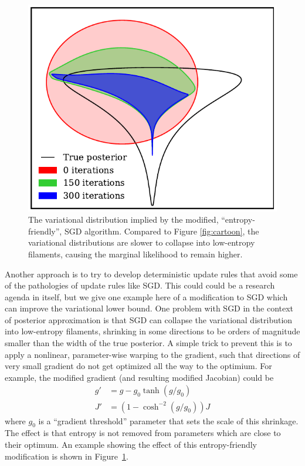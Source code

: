 \documentclass[]{article}
\begin{document}
\begin{figure}
\begin{center}
\includegraphics[width=0.9\columnwidth]{../experiments/2015_03_02_funnel/3_grad_threshold/dists.pdf}
\caption{The variational distribution implied by the modified, ``entropy-friendly'', SGD algorithm.
Compared to Figure \ref{fig:cartoon}, the variational distributions are slower to collapse into low-entropy filaments, causing the marginal likelihood to remain higher.}
\label{fig:cartoon-fatter}
\end{center}
\end{figure}

Another approach is to try to develop deterministic update rules
that avoid some of the pathologies of update rules like SGD.
This could could be a research agenda in itself, but we give one example here of a modification to
SGD which can improve the variational lower bound.
One problem with SGD in the context of posterior approximation is that
SGD can collapse the variational distribution into low-entropy filaments, shrinking in some directions to be orders of magnitude smaller than the width of the true posterior.
A simple trick to prevent this is to apply a nonlinear, parameter-wise warping
to the gradient, such that directions of very small gradient do not get optimized all the way
to the optimium.
For example, the modified gradient (and resulting modified Jacobian) could be
\begin{align}
g' & = g - g_0 \tanh \left(g / g_0 \right) \\
J' & = \left(1 - \cosh^{-2} (g / g_0) \right) J 
\end{align}
where $g_0$ is a ``gradient threshold'' parameter that sets the scale of this shrinkage.
The effect is that entropy is not removed from parameters which are close to their optimum.
An example showing the effect of this entropy-friendly modification is shown in Figure~\ref{fig:cartoon-fatter}.
\end{document}
